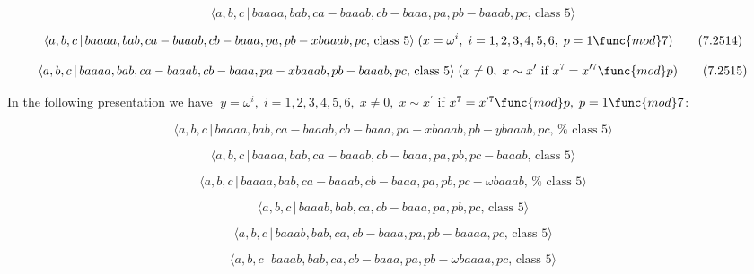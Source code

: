 \documentclass[10pt]{article}
\begin{document}
\begin{equation}
\langle a,b,c\,|\,baaaa,bab,ca-baaab,cb-baaa,pa,pb-baaab,pc,\,\text{class }%
5\rangle  \tag{7.2513}
\end{equation}

\begin{equation}
\langle a,b,c\,|\,baaaa,bab,ca-baaab,cb-baaa,pa,pb-xbaaab,pc,\,\text{class }%
5\rangle \;(x=\omega ^{i},\;i=1,2,3,4,5,6,\;p=1\func{mod}7)  \tag{7.2514}
\end{equation}

\begin{equation}
\langle a,b,c\,|\,baaaa,bab,ca-baaab,cb-baaa,pa-xbaaab,pb-baaab,pc,\,\text{%
class }5\rangle \;(x\neq 0,\;x\sim x^{\prime }\text{ if }x^{7}=x^{\prime 7}%
\func{mod}p)  \tag{7.2515}
\end{equation}

In the following presentation we have $\;y=\omega
^{i},\;i=1,2,3,4,5,6,\;x\neq 0,\;x\sim x^{\prime }$ if $x^{7}=x^{\prime 7}%
\func{mod}p,\;p=1\func{mod}7$:

\begin{equation}
\langle a,b,c\,|\,baaaa,bab,ca-baaab,cb-baaa,pa-xbaaab,pb-ybaaab,pc,\,\text{%
class }5\rangle  \tag{7.2516}
\end{equation}

\begin{equation}
\langle a,b,c\,|\,baaaa,bab,ca-baaab,cb-baaa,pa,pb,pc-baaab,\,\text{class }%
5\rangle  \tag{7.2517}
\end{equation}

\begin{equation}
\langle a,b,c\,|\,baaaa,bab,ca-baaab,cb-baaa,pa,pb,pc-\omega baaab,\,\text{%
class }5\rangle  \tag{7.2518}
\end{equation}

\begin{equation}
\langle a,b,c\,|\,baaab,bab,ca,cb-baaa,pa,pb,pc,\,\text{class }5\rangle 
\tag{7.2519}
\end{equation}

\begin{equation}
\langle a,b,c\,|\,baaab,bab,ca,cb-baaa,pa,pb-baaaa,pc,\,\text{class }5\rangle
\tag{7.2520}
\end{equation}

\begin{equation}
\langle a,b,c\,|\,baaab,bab,ca,cb-baaa,pa,pb-\omega baaaa,pc,\,\text{class }%
5\rangle  \tag{7.2521}
\end{equation}
\end{document}
